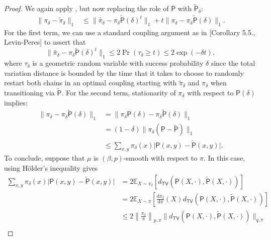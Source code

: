 \documentclass[11pt]{article}
\theoremstyle{remark}
\begin{document}
\begin{proof}
    We again apply , but now replacing the role of $\mathsf{P}$ with $\widetilde{\mathsf{P}}_{\delta}$:
    \begin{align*}
        \|\pi_{\delta}-\widetilde{\pi}_{\delta}\|_1&\leq \| \widetilde{\pi_{\delta}}-\pi_{\delta}\widetilde{\mathsf{P}}(\delta)^t\|_1+t\|\pi_{\delta}-\pi_{\delta}\widetilde{\mathsf{P}}(\delta)\|_1.
    \end{align*}
    For the first term, we can use a standard coupling argument as in [Corollary 5.5., Levin-Peres] to assert that 
    \begin{equation*}
        \| \widetilde{\pi_{\delta}}-\pi_{\delta}\widetilde{\mathsf{P}}(\delta)^t\|_1\leq 2\Pr(\tau_{\delta}\geq t)\leq 2\exp(-\delta t),
    \end{equation*}
    where $\tau_{\delta}$ is a geometric random variable with success probability $\delta$ since the total variation distance is bounded by the time that it takes to choose to randomly restart both chains in an optimal coupling starting with $\widetilde{\pi}_{\delta}$ and $\pi_{\delta}$ when transitioning via $\widetilde{\mathsf{P}}$. For the second term, stationarity of $\pi_{\delta}$ with respect to $\mathsf{P}(\delta)$ implies:
    \begin{align*}
        \|\pi_{\delta}-\pi_{\delta}\widetilde{\mathsf{P}}(\delta)\|_1&=\|\pi_{\delta}\mathsf{P}(\delta)-\pi_{\delta}\widetilde{\mathsf{P}}(\delta)\|_1\\
        &=(1-\delta)\|\pi_{\delta}(\mathsf{P}-\widetilde{\mathsf{P}})\|_1\\
        &\leq \sum_{x,y}\pi_{\delta}(x)\vert \mathsf{P}(x,y)-\widetilde{\mathsf{P}}(x,y)\vert.
    \end{align*}
    To conclude, suppose that $\mu$ is $(\beta,p)$-smooth with respect to $\pi$. In this case, using H\"older's inequality gives
    \begin{align*}
        \sum_{x,y}\pi_{\delta}(x)\vert \mathsf{P}(x,y)-\widetilde{\mathsf{P}}(x,y)\vert&=2\mathbb{E}_{X\sim \pi_{\delta}}[d_{\mathsf{TV}}(\mathsf{P}(X,\cdot),\widetilde{\mathsf{P}}(X,\cdot))]\\
        &=2\mathbb{E}_{X\sim \pi}\left[\frac{\mathrm{d}\pi_{\delta}}{\mathrm{d}\pi}(X)d_{\mathsf{TV}}(\mathsf{P}(X,\cdot),\widetilde{\mathsf{P}}(X,\cdot))\right]\\
        &\leq 2\left\|\frac{\pi_{\delta}}{\pi}\right\|_{p,\pi}\|d_{\mathsf{TV}}(\mathsf{P}(X,\cdot),\widetilde{\mathsf{P}}(X,\cdot))\|_{q,\pi}\\

\end{align*}
\end{proof}
\end{document}
